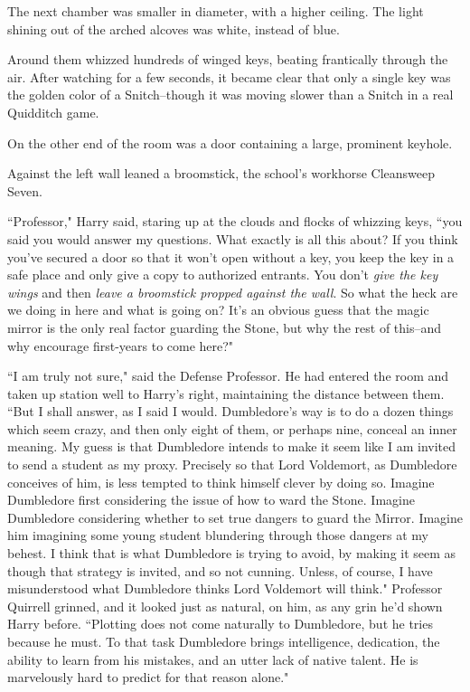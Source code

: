 \later

The next chamber was smaller in diameter, with a higher ceiling. The light shining out of the arched alcoves was white, instead of blue.

Around them whizzed hundreds of winged keys, beating frantically through the air. After watching for a few seconds, it became clear that only a single key was the golden color of a Snitch\---though it was moving slower than a Snitch in a real Quidditch game.

On the other end of the room was a door containing a large, prominent keyhole.

Against the left wall leaned a broomstick, the school's workhorse Cleansweep Seven.

``Professor," Harry said, staring up at the clouds and flocks of whizzing keys, ``you said you would answer my questions. What exactly is all this about? If you think you've secured a door so that it won't open without a key, you keep the key in a safe place and only give a copy to authorized entrants. You don't \emph{give the key wings} and then \emph{leave a broomstick propped against the wall}. So what the heck are we doing in here and what is going on? It's an obvious guess that the magic mirror is the only real factor guarding the Stone, but why the rest of this\---and why encourage first-years to come here?"

``I am truly not sure," said the Defense Professor. He had entered the room and taken up station well to Harry's right, maintaining the distance between them. ``But I shall answer, as I said I would. Dumbledore's way is to do a dozen things which seem crazy, and then only eight of them, or perhaps nine, conceal an inner meaning. My guess is that Dumbledore intends to make it seem like I am invited to send a student as my proxy. Precisely so that Lord Voldemort, as Dumbledore conceives of him, is less tempted to think himself clever by doing so. Imagine Dumbledore first considering the issue of how to ward the Stone. Imagine Dumbledore considering whether to set true dangers to guard the Mirror. Imagine him imagining some young student blundering through those dangers at my behest. I think that is what Dumbledore is trying to avoid, by making it seem as though that strategy is invited, and so not cunning. Unless, of course, I have misunderstood what Dumbledore thinks Lord Voldemort will think." Professor Quirrell grinned, and it looked just as natural, on him, as any grin he'd shown Harry before. ``Plotting does not come naturally to Dumbledore, but he tries because he must. To that task Dumbledore brings intelligence, dedication, the ability to learn from his mistakes, and an utter lack of native talent. He is marvelously hard to predict for that reason alone."

